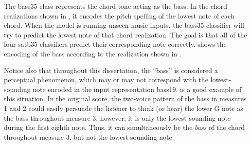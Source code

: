 
The \gls{bass35} class represents the chord tone acting as
the bass. In the chord realizations shown in
, it encodes the pitch spelling of the
lowest note of each chord. When the model is running unseen
music inputs, the \gls{bass35} classifier will try to
predict the lowest note of that chord realization. The goal
is that all of the four \gls{satb35} classifiers predict
their corresponding note correctly.  shows
the encoding of the bass according to the realization shown
in .

Notice also that throughout this dissertation, the ``bass''
is considered a perceptual phenomenon, which may or may not
correspond with the lowest-sounding note encoded in the
input representation \gls{bass19}.  is
a good example of this situation. In the original score, the
two-voice pattern of the bass in measures 1 and 2 could
easily persuade the listener to think (or hear) the lower G
note as the bass throughout measure 3, however, it is only
the lowest-sounding note during the first eighth note. Thus,
it can simultaneously be the \emph{bass} of the chord
throughout measure 3, but not the lowest-sounding note.




